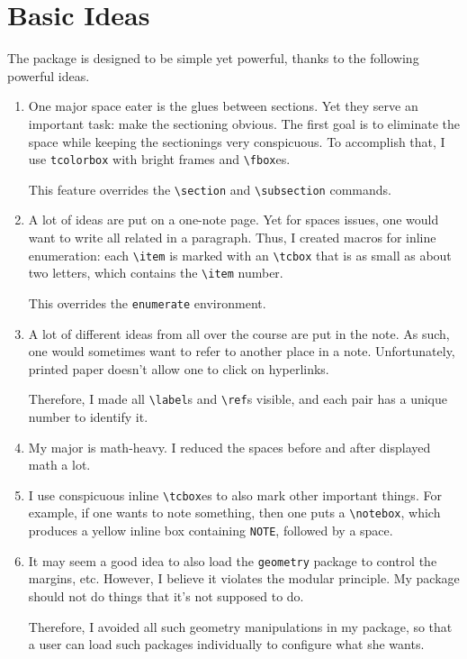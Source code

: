 \documentclass{article}
\begin{document}
\section{Basic Ideas}
The package is designed to be simple yet powerful, thanks to the following
powerful ideas.
\begin{enumerate}
	\item One major space eater is the glues between sections. Yet they serve an
		important task: make the sectioning obvious. The first goal is to
		eliminate the space while keeping the sectionings very conspicuous. To
		accomplish that, I use \texttt{tcolorbox} with bright frames and
		\verb|\fbox|es.

		This feature overrides the \verb|\section| and \verb|\subsection|
		commands.
	\item A lot of ideas are put on a one-note page. Yet for spaces issues, one
		would want to write all related in a paragraph. Thus, I created macros
		for inline enumeration: each \verb|\item| is marked with an \verb|\tcbox|
		that is as small as about two letters, which contains the \verb|\item|
		number.

		This overrides the \verb|enumerate| environment.
	\item A lot of different ideas from all over the course are put in the note.
		As such, one would sometimes want to refer to another place in a note.
		Unfortunately, printed paper doesn't allow one to click on hyperlinks.
		
		Therefore, I made all \verb|\label|s and \verb|\ref|s visible, and each
		pair has a unique number to identify it.
	\item My major is math-heavy. I reduced the spaces before and after
		displayed math a lot.
	\item I use conspicuous inline \verb|\tcbox|es to also mark other important
		things. For example, if one wants to note something, then one puts a
		\verb|\notebox|, which produces a yellow inline box containing
		\texttt{NOTE}, followed by a space.
	\item It may seem a good idea to also load the \texttt{geometry} package to
		control the margins, etc. However, I believe it violates the modular
		principle. My package should not do things that it's not supposed to do. 

		Therefore, I avoided all such geometry manipulations in my package, so
		that a user can load such packages individually to configure what she
		wants.
\end{enumerate}
\end{document}
